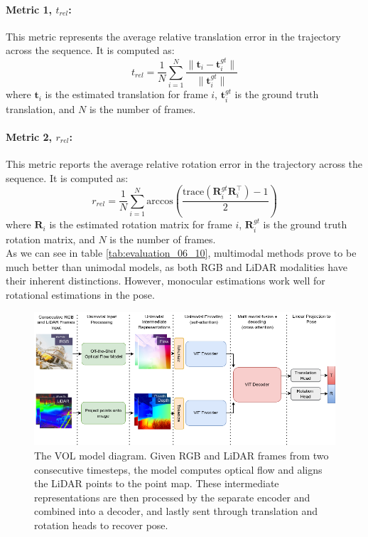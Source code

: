 \documentclass[11pt,a4paper]{article}
\begin{document}
\paragraph{\textbf{Metric 1,   }\textit{$t_{rel}$}:}
This metric represents the average relative translation error in the trajectory across the sequence. It is computed as:
\[
t_{rel} = \frac{1}{N} \sum_{i=1}^{N} \frac{\|\mathbf{t}_i - \mathbf{t}_i^{gt}\|}{\|\mathbf{t}_i^{gt}\|}
\]
where $\mathbf{t}_i$ is the estimated translation for frame $i$, $\mathbf{t}_i^{gt}$ is the ground truth translation, and $N$ is the number of frames.

\paragraph{\textbf{Metric 2,   }\textit{$r_{rel}$}:}
This metric reports the average relative rotation error in the trajectory across the sequence. It is computed as:
\[
r_{rel} = \frac{1}{N} \sum_{i=1}^{N} \text{arccos} \left( \frac{\text{trace}(\mathbf{R}_i^{gt} \mathbf{R}_i^\top) - 1}{2} \right)
\]
where $\mathbf{R}_i$ is the estimated rotation matrix for frame $i$, $\mathbf{R}_i^{gt}$ is the ground truth rotation matrix, and $N$ is the number of frames. \\

As we can see in table \ref{tab:evaluation_06_10}, multimodal methods prove to be much better than unimodal models, as both RGB and LiDAR modalities have their inherent distinctions. However, monocular estimations work well for rotational estimations in the pose.

\begin{figure} [t]
    \centering
    \includegraphics[width=0.95\linewidth]{Reports/2-Baselines-and-Model-Proposal/images/vol_model.png}
    \caption {The VOL model diagram. Given RGB and LiDAR frames from two consecutive timesteps, the model computes optical flow and aligns the LiDAR points to the point map. These intermediate representations are then processed by the separate encoder and combined into a decoder, and lastly sent through translation and rotation heads to recover pose.}
    \label{fig:model-diagram}
\end{figure}
\end{document}
